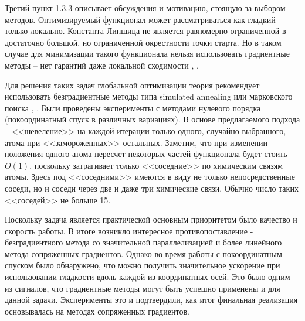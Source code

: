 Третий пункт 1.3.3 описывает обсуждения и мотивацию, стоящую за выбором методов. Оптимизируемый функционал может рассматриваться как гладкий только локально. Константа Липшица не является равномерно ограниченной в достаточно большой, но ограниченной окрестности точки старта. Но в таком случае для минимизации такого функционала нельзя использовать градиентные методы -- нет гарантий даже локальной сходимости \cite{ghadimi2015generalized}, \cite{nesterov2017random}. 
   
Для решения таких задач глобальной оптимизации теория рекомендует использовать безградиентные методы типа simulated annealing или марковского поиска \cite{zhigljavsky2007stochastic}, \cite{zhigljavsky2012theory}.
Были проведены эксперименты с методами нулевого порядка (покоординатный спуск в различных вариациях). В основе предлагаемого подхода -- <<шевеление>> на каждой итерации только одного, случайно выбранного, атома при <<замороженных>> остальных. Заметим, что при изменении положения одного атома пересчет некоторых частей функционала будет стоить ${O}\left( 1 \right)$, поскольку затрагивает только <<соседние>> по химическим связям атомы. Здесь под <<соседними>> имеются в виду не только непосредственные соседи, но и соседи через две и даже три химические связи. Обычно число таких <<соседей>> не больше 15. 

Поскольку задача является практической основным приоритетом было качество и скорость работы. В итоге возникло интересное противопоставление - безградиентного метода со значительной параллелизацией и более линейного метода сопряженных градиентов. Однако во время работы с покоординатным спуском было обнаружено, что можно получить значительное ускорение при использовании гладкости вдоль каждой из координатных осей. Это было одним из сигналов, что градиентные методы могут быть успешно применены и для данной задачи. Эксперименты это и подтвердили, как итог финальная реализация основывалась на методах сопряженных градиентов.

\begin{table}[h]
\caption{Сравнение характеристик методов}
\label{tabular:timesandtenses}
\centering
{}
\end{table}

